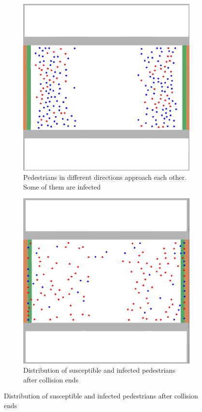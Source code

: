\begin{figure}[H]
    \centering
    
    \begin{subfigure}{0.4\textwidth}
        \centering
        \includegraphics[width=\textwidth]{images/task4_cooridor.png}
        \caption{Pedestrians in different directions approach each other. Some of them are infected}
    \end{subfigure}
      \hspace{0.05\textwidth}
    \begin{subfigure}{0.4\textwidth}
        \centering
        \includegraphics[width=\textwidth]{images/task4_cooridor2.png}
        \caption{Distribution of susceptible and infected pedestrians after collision ends }
    \end{subfigure}
    

\end{figure}
